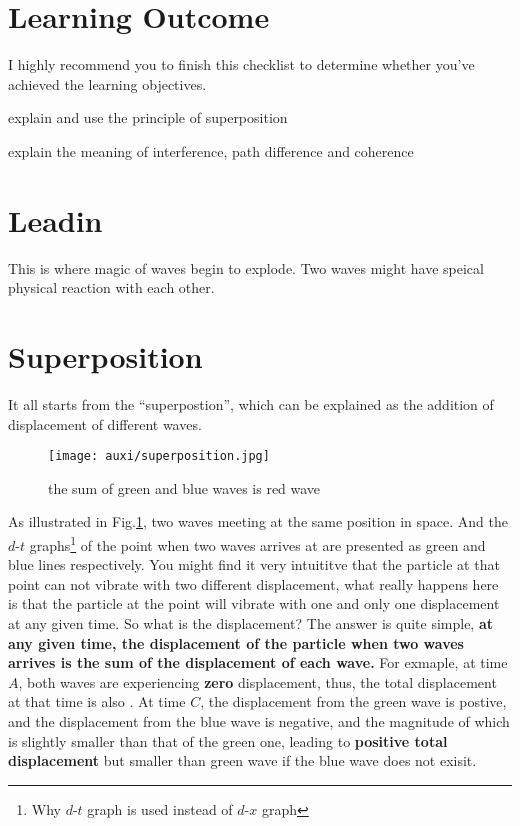 \documentclass[a4paper]{tufte-handout}
\title{}
\author{Sanjin Zhao}
\begin{document}
\maketitle%
\section*{Learning Outcome}
I highly recommend you to finish this checklist to determine whether you've achieved the learning objectives.
\begin{todolist}
  \item explain and use the principle of superposition
  \item explain the meaning of interference, path difference and coherence
\end{todolist}
\clearpage

\section{Leadin}
This is where magic of waves begin to explode. Two waves might have speical physical reaction with each other. 

\section{Superposition}
It all starts from the ``superpostion'', which can be explained as the addition of displacement of different waves. 
\begin{figure}[h]
\centering
\texttt{[image: auxi/superposition.jpg]}
\caption{the sum of green and blue waves is red wave}
\label{fig:superposition}
\end{figure}

As illustrated in Fig.\ref{fig:superposition}, two waves meeting at the same position in space. And the $d$-$t$ graphs\footnote{Why $d$-$t$ graph is used instead of $d$-$x$ graph} of the point when two waves arrives at are presented as green and blue lines respectively. You might find it very intuititve that the particle at that point can not vibrate with two different displacement, what really happens here is that the particle at the point will vibrate with one and only one displacement at any given time. So what is the displacement? The answer is quite simple, \textbf{at any given time, the displacement of the particle when two waves arrives is the sum of the displacement of each wave.} For exmaple, at time $A$, both waves are experiencing \textbf{zero} displacement, thus, the total displacement at that time is also \uline{\hspace{0.5in}}. At time $C$, the displacement from the green wave is postive, and the displacement from the blue wave is negative, and the magnitude of which is slightly smaller than that of the green one, leading to \textbf{positive total displacement} but smaller than green wave if the blue wave does not exisit.
\end{document}
